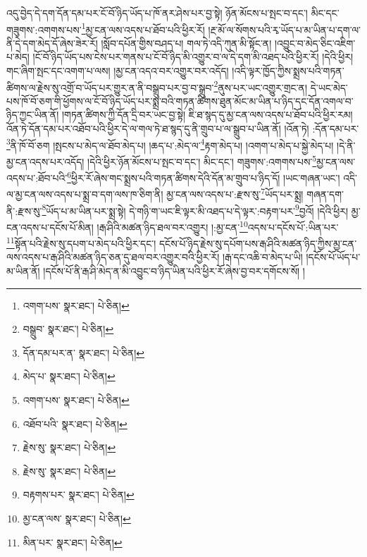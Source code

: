 འདུ་བྱེད་དེ་དག་དོན་དམ་པར་ངོ་བོ་ཉིད་ཡོད་པ་ཁོ་ནར་ཤེས་པར་བྱ་སྟེ། ཉོན་མོངས་པ་སྤང་བ་དང་། མིང་དང་གཟུགས་:འགགས་པས་\footnote{འགག་པས་  སྣར་ཐང་།  པེ་ཅིན། }མྱ་ངན་ལས་འདས་པ་ཐོབ་པའི་ཕྱིར་རོ། །རྔ་མོ་ལ་སོགས་པའི་རྭ་ཡོད་པ་མ་ཡིན་པ་དག་ལ་ནི་དེ་དག་མེད་དོ་ཞེས་ཟེར་རོ། །སློབ་དཔོན་གྱིས་བཤད་པ། གལ་ཏེ་འདི་ཀུན་མི་སྟོང་ན། །འབྱུང་བ་མེད་ཅིང་འཇིག་པ་མེད། །ངོ་བོ་ཉིད་ཡོད་པས་ངེས་པར་གནས་པ་ངོ་བོ་ཉིད་མི་འགྱུར་བ་ལ་དེ་དག་མི་འཐད་པའི་ཕྱིར་རོ། །དེའི་ཕྱིར། གང་ཞིག་སྤང་དང་འགག་པ་ལས། །མྱ་ངན་འདའ་བར་འགྱུར་བར་འདོད། །འདི་ལྟར་ཁྱོད་ཀྱིས་སྨྲས་པའི་གཏན་ཚིགས་ལ་རྗེས་སུ་འགྲོ་བ་ཡོད་པར་གྱུར་ན་ནི་བསྒྲུབ་པར་བྱ་བ་སྒྲུབ་\footnote{བསྒྲུབ་  སྣར་ཐང་།  པེ་ཅིན། }ནུས་པར་ཡང་འགྱུར་གྲང་ན། དེ་ཡང་མེད་པས་ཁོ་བོ་ཅག་གི་ཕྱོགས་ལ་ངོ་བོ་ཉིད་ཡོད་པར་སྨྲ་བའི་གཏན་ཚིགས་ཐུན་མོང་མ་ཡིན་པ་ཉིད་དང་དོན་འགལ་བ་ཉིད་ཀྱང་ཡིན་ནོ། །གཏན་ཚིགས་ཀྱི་དོན་དྲི་བར་ཡང་བྱ་སྟེ། ཇི་ཐ་སྙད་དུ་མྱ་ངན་ལས་འདས་པ་ཐོབ་པའི་ཕྱིར་རམ། འོན་ཏེ་དོན་དམ་པར་འཐོབ་པའི་ཕྱིར་དེ་ལ་གལ་ཏེ་ཐ་སྙད་དུ་ནི་གྲུབ་པ་ལ་སྒྲུབ་པ་ཡིན་ནོ། །འོན་ཏེ། :དོན་དམ་པར་\footnote{དོན་དམ་པར་ན་  སྣར་ཐང་།  པེ་ཅིན། }ནི་ཁོ་བོ་ཅག །སྤངས་པ་མེད་ལ་ཐོབ་མེད་པ། །ཆད་པ་:མེད་ལ་\footnote{མེད་པ་  སྣར་ཐང་།  པེ་ཅིན། }རྟག་མེད་པ། །འགག་པ་མེད་པ་སྐྱེ་མེད་པ། །དེ་ནི་མྱ་ངན་འདས་པར་འདོད། །དེའི་ཕྱིར་ཉོན་མོངས་པ་སྤང་བ་དང་། མིང་དང་། གཟུགས་:འགགས་པས་\footnote{འགག་པས་  སྣར་ཐང་།  པེ་ཅིན། }མྱ་ངན་ལས་འདས་པ་:ཐོབ་པའི་\footnote{འཐོབ་པའི་  སྣར་ཐང་།  པེ་ཅིན། }ཕྱིར་རོ་ཞེས་གང་སྨྲས་པའི་གཏན་ཚིགས་དེའི་དོན་མ་གྲུབ་པ་ཉིད་དོ། །ཡང་གཞན་ཡང་། འདི་ལ་མྱ་ངན་ལས་འདས་པ་སྨྲ་བ་དག་ལས་ཁ་ཅིག་ནི། མྱ་ངན་ལས་འདས་པ་:རྫས་སུ་\footnote{རྗེས་སུ་  སྣར་ཐང་།  པེ་ཅིན། }ཡོད་པར་སྨྲ། གཞན་དག་ནི་:རྫས་སུ་\footnote{རྗེས་སུ་  སྣར་ཐང་།  པེ་ཅིན། }ཡོད་པ་མ་ཡིན་པར་སྨྲ་སྟེ། དེ་གཉི་ག་ཡང་ཇི་ལྟར་མི་འཐད་པ་དེ་ལྟར་:བརྟག་པར་\footnote{བརྟགས་པར་  སྣར་ཐང་།  པེ་ཅིན། }བྱའོ། །དེའི་ཕྱིར། མྱ་ངན་འདས་པ་དངོས་པོ་མིན། །རྒ་ཤིའི་མཚན་ཉིད་ཐལ་བར་འགྱུར། །:མྱ་ངན་\footnote{མྱ་ངན་ལས་  སྣར་ཐང་།  པེ་ཅིན། }འདས་པ་དངོས་པོ་:ཡིན་པར་\footnote{མིན་པར་  སྣར་ཐང་།  པེ་ཅིན། }སྟོན་པའི་རྗེས་སུ་དཔག་པ་མེད་པའི་ཕྱིར་དང་། དངོས་པོ་ཉིད་རྗེས་སུ་དཔོག་པས་རྒ་ཤིའི་མཚན་ཉིད་ཀྱིས་མྱ་ངན་ལས་འདས་པ་རྒ་ཤིའི་མཚན་ཉིད་ཅན་དུ་ཐལ་བར་འགྱུར་བའི་ཕྱིར་རོ། །རྒ་དང་འཆི་བ་མེད་པ་ཡི། །དངོས་པོ་ཡོད་པ་མ་ཡིན་ནོ། །དངོས་པོ་ནི་རྒ་ཤི་མེད་ན་མི་འབྱུང་བ་ཉིད་ཡིན་པའི་ཕྱིར་རོ་ཞེས་བྱ་བར་དགོངས་སོ། །

